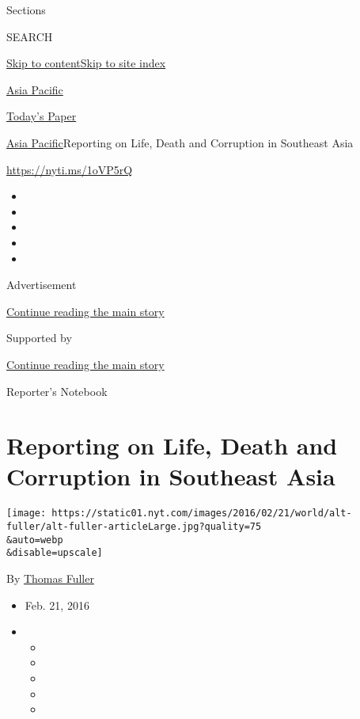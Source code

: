 Sections

SEARCH

\protect\hyperlink{site-content}{Skip to
content}\protect\hyperlink{site-index}{Skip to site index}

\href{https://www.nytimes.com/section/world/asia}{Asia Pacific}

\href{https://myaccount.nytimes.com/auth/login?response_type=cookie\&client_id=vi}{}

\href{https://www.nytimes.com/section/todayspaper}{Today's Paper}

\href{/section/world/asia}{Asia Pacific}\textbar{}Reporting on Life,
Death and Corruption in Southeast Asia

\url{https://nyti.ms/1oVP5rQ}

\begin{itemize}
\item
\item
\item
\item
\item
\end{itemize}

Advertisement

\protect\hyperlink{after-top}{Continue reading the main story}

Supported by

\protect\hyperlink{after-sponsor}{Continue reading the main story}

Reporter's Notebook

\hypertarget{reporting-on-life-death-and-corruption-in-southeast-asia}{%
\section{Reporting on Life, Death and Corruption in Southeast
Asia}\label{reporting-on-life-death-and-corruption-in-southeast-asia}}

\texttt{[image: https://static01.nyt.com/images/2016/02/21/world/alt-fuller/alt-fuller-articleLarge.jpg?quality=75\\\&auto=webp\\\&disable=upscale]}

By \href{https://www.nytimes.com/by/thomas-fuller}{Thomas Fuller}

\begin{itemize}
\item
  Feb. 21, 2016
\item
  \begin{itemize}
  \item
  \item
  \item
  \item
  \item
  \end{itemize}
\end{itemize}

